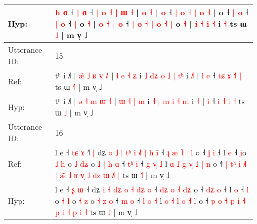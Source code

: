 \documentclass[10pt]{article}
\DeclareRobustCommand{\hl}[1]{{\textcolor{red}{#1}}}
\begin{document}
\begin{longtable}{ll}
 \\
Hyp: & \hl{}\hl{h} \hl{ɑ} ˧ \hl{|} \hl{}\hl{ɑ} ˧ \hl{}\hl{|} \hl{o} \hl{˧} \hl{|} \hl{ɯ} \hl{˧} |\hl{}\hl{}\hl{} \hl{o} \hl{}\hl{˧} |\hl{}\hl{}\hl{}\hl{}\hl{}\hl{}\hl{}\hl{}\hl{} \hl{o} ˧ \hl{|} \hl{o} \hl{˧} \hl{|} \hl{}\hl{o} \hl{˧} |\hl{}\hl{} o ˧ \hl{|} \hl{o} ˧ \hl{|} \hl{o} ˧ \hl{}\hl{|} o \hl{˧} | \hl{}\hl{o} \hl{˧} \hl{|} \hl{o} ˧ \hl{}\hl{|} \hl{}\hl{o} \hl{˧} \hl{}\hl{|} \hl{o} \hl{˧} \hl{|} o \hl{˧} |\hl{}\hl{}\hl{}\hl{}\hl{} \hl{i} \hl{}\hl{˧} \hl{i} \hl{˧} i\hl{}\hl{}\hl{} \hl{˧} ts ɯ \hl{}\hl{˩} | m v̩ ˩
 \\
\midrule
Utterance ID: & 15 \\
Ref: & tʰ i ˩˥ | \hl{æ}\hl{̃} \hl{˩} \hl{ʁ} \hl{v}\hl{̩} \hl{˩}\hl{˥} | \hl{l} \hl{e} \hl{˧} \hl{ʑ} i \hl{˩} \hl{d}\hl{ʑ} \hl{o} \hl{˩} \hl{|} \hl{t}\hl{ʰ} i \hl{˩}\hl{˥} |\hl{ }\hl{l} \hl{e} ˧ \hl{t}\hl{ɕ} \hl{ɤ} \hl{˧}\hl{˥} \hl{|} ts ɯ \hl{˧}\hl{˥} | m v̩ ˩
 \\
Hyp: & tʰ i ˩˥ | \hl{}\hl{ə} \hl{˧} \hl{m} \hl{}\hl{ɯ} \hl{}\hl{˧} | \hl{ɯ} \hl{˧} \hl{|} \hl{m} i \hl{˧} \hl{}\hl{|} \hl{m} \hl{i} \hl{˧} \hl{}\hl{m} i \hl{}\hl{˧} |\hl{}\hl{} \hl{i} ˧ \hl{}\hl{i} \hl{˧} \hl{}\hl{i} \hl{˧} ts ɯ \hl{}\hl{˩} | m v̩ ˩
 \\
\midrule
Utterance ID: & 16 \\
Ref: & l e ˧ \hl{t}\hl{ɕ} \hl{ɤ} ˧\hl{˥}\hl{ }\hl{|} dʑ\hl{ }\hl{o} \hl{˩} \hl{|} \hl{t}\hl{ʰ} \hl{i} \hl{˩}\hl{˥} \hl{|}\hl{ }\hl{h} \hl{i}\hl{̃} ˧ \hl{}\hl{ɻ} \hl{æ} \hl{˥} \hl{|}\hl{ }\hl{l} o ˧ \hl{}\hl{ʝ} \hl{i} ˧ l \hl{e} ˧ \hl{}\hl{j}o \hl{˩} \hl{h} o \hl{˩} \hl{d}\hl{ʑ} o\hl{ }\hl{˩} \hl{|} \hl{h} \hl{ɑ} ˧ \hl{t}\hl{ʰ} \hl{i} ˧ \hl{g} \hl{v}\hl{̩} \hl{˩} l\hl{ }\hl{ɑ} \hl{˩} \hl{g} \hl{v}\hl{̩} \hl{˩} \hl{|} \hl{n} o ˧\hl{˥}\hl{ }\hl{|}\hl{ }\hl{t}\hl{ʰ} \hl{i} \hl{˩}\hl{˥} \hl{|} \hl{æ}\hl{̃} \hl{˩} \hl{ʁ} \hl{v}\hl{̩} \hl{˩} \hl{d}\hl{z} \hl{ɯ} \hl{˩}\hl{˥} \hl{|} ts ɯ \hl{˧}\hl{˥} | m v̩ ˩
 \\
Hyp: & l e ˧ \hl{}\hl{ʂ} \hl{ɯ} ˧\hl{}\hl{}\hl{} dʑ\hl{}\hl{} \hl{i} \hl{˧} \hl{d}\hl{ʑ} \hl{o} \hl{}\hl{˧} \hl{}\hl{d}\hl{ʑ} \hl{}\hl{o} ˧ \hl{d}\hl{ʑ} \hl{o} \hl{˧} \hl{}\hl{d}\hl{ʑ} o ˧ \hl{d}\hl{ʑ} \hl{o} ˧ l \hl{o} ˧ \hl{l}\hl{ }o \hl{˧} \hl{l} o \hl{˧} \hl{}\hl{z} o\hl{}\hl{} \hl{˧} \hl{z} \hl{o} ˧ \hl{}\hl{m} \hl{o} ˧ \hl{l} \hl{}\hl{o} \hl{˧} l\hl{}\hl{} \hl{o} \hl{˧} \hl{}\hl{l} \hl{o} \hl{˧} \hl{l} o ˧\hl{}\hl{}\hl{}\hl{}\hl{}\hl{} \hl{p} \hl{}\hl{o} \hl{˧} \hl{}\hl{p} \hl{i} \hl{˧} \hl{}\hl{p} \hl{i} \hl{}\hl{˧} \hl{p} \hl{}\hl{i} \hl{˧} ts ɯ \hl{}\hl{˩} | m v̩ ˩
 \\

\end{longtable}
\end{document}
